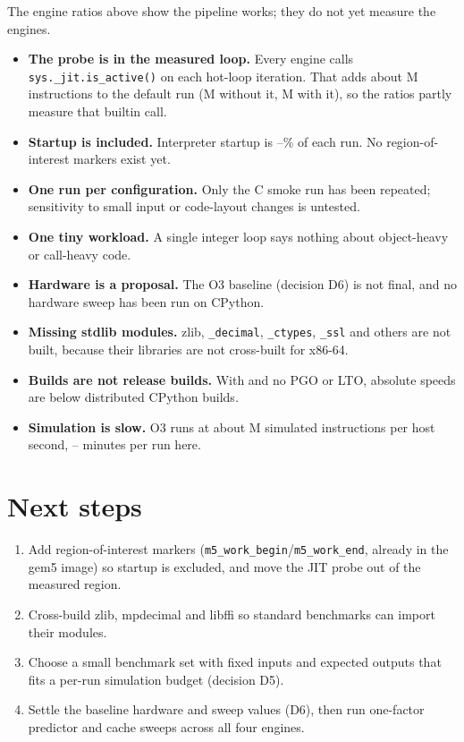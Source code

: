 \documentclass[11pt]{article}
\begin{document}
The engine ratios above show the pipeline works; they do not yet measure the engines.
\begin{itemize}
  \item \textbf{The probe is in the measured loop.} Every engine calls \texttt{sys.\_jit.is\_active()} on each hot-loop iteration. That adds about \ProbeOverheadM M instructions to the default run (\NoProbeInstsM M without it, \ProbeInstsM M with it), so the ratios partly measure that builtin call.
  \item \textbf{Startup is included.} Interpreter startup is \StartupShareMin--\StartupShareMax\% of each run. No region-of-interest markers exist yet.
  \item \textbf{One run per configuration.} Only the C smoke run has been repeated; sensitivity to small input or code-layout changes is untested.
  \item \textbf{One tiny workload.} A single integer loop says nothing about object-heavy or call-heavy code.
  \item \textbf{Hardware is a proposal.} The O3 baseline (decision D6) is not final, and no hardware sweep has been run on CPython.
  \item \textbf{Missing stdlib modules.} zlib, \texttt{\_decimal}, \texttt{\_ctypes}, \texttt{\_ssl} and others are not built, because their libraries are not cross-built for x86-64.
  \item \textbf{Builds are not release builds.} With \texttt{\BuildOpt} and no PGO or LTO, absolute speeds are below distributed CPython builds.
  \item \textbf{Simulation is slow.} O3 runs at about \SimMIPS M simulated instructions per host second, \HostMinMin--\HostMinMax{} minutes per run here.
\end{itemize}

\section{Next steps}

\begin{enumerate}
  \item Add region-of-interest markers (\texttt{m5\_work\_begin}/\texttt{m5\_work\_end}, already in the gem5 image) so startup is excluded, and move the JIT probe out of the measured region.
  \item Cross-build zlib, mpdecimal and libffi so standard benchmarks can import their modules.
  \item Choose a small benchmark set with fixed inputs and expected outputs that fits a per-run simulation budget (decision D5).
  \item Settle the baseline hardware and sweep values (D6), then run one-factor predictor and cache sweeps across all four engines.
\end{enumerate}
\end{document}

